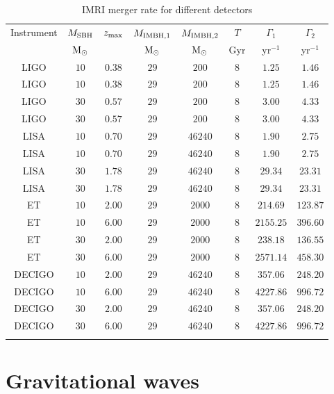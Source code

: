 \documentclass[twocolumn]{aastex62}
\newcommand{\Ms}{{\rm M}_\odot}
\newcommand{\ibh}{{\rm IMBH}}
\begin{document}
\begin{table}
\caption{IMRI merger rate for different detectors}
\begin{center}
\begin{tabular}{cccccccc}
\hline
Instrument & $M_{\rm SBH}$ & $z_{\rm max}$ & $M_{\ibh ,1}$ & $M_{\ibh ,2}$ & $T$ & $\Gamma_1$ & $\Gamma_2$ \\
   & $\Ms$ & &$\Ms$ & $\Ms$ & Gyr & yr$^{-1}$ & yr$^{-1}$ \\ 
\hline
LIGO & $10$ & $0.38$ & $29$ & $200$ & $8$ & $1.25$ &$1.46$ \\
LIGO & $10$ & $0.38$ & $29$ & $200$ & $8$ & $1.25$ &$1.46$ \\
LIGO & $30$ & $0.57$ & $29$ & $200$ & $8$ & $3.00$ &$4.33$ \\
LIGO & $30$ & $0.57$ & $29$ & $200$ & $8$ & $3.00$ &$4.33$ \\
LISA & $10$ & $0.70$ & $29$ & $46240$ & $8$ & $1.90$ &$2.75$ \\
LISA & $10$ & $0.70$ & $29$ & $46240$ & $8$ & $1.90$ &$2.75$ \\
LISA & $30$ & $1.78$ & $29$ & $46240$ & $8$ & $29.34$ &$23.31$ \\
LISA & $30$ & $1.78$ & $29$ & $46240$ & $8$ & $29.34$ &$23.31$ \\
ET & $10$ & $2.00$ & $29$ & $2000$ & $8$ & $214.69$ &$123.87$ \\
ET & $10$ & $6.00$ & $29$ & $2000$ & $8$ & $2155.25$ &$396.60$ \\
ET & $30$ & $2.00$ & $29$ & $2000$ & $8$ & $238.18$ &$136.55$ \\
ET & $30$ & $6.00$ & $29$ & $2000$ & $8$ & $2571.14$ &$458.30$ \\
DECIGO & $10$ & $2.00$ & $29$ & $46240$ & $8$ & $357.06$ &$248.20$ \\
DECIGO & $10$ & $6.00$ & $29$ & $46240$ & $8$ & $4227.86$ &$996.72$ \\
DECIGO & $30$ & $2.00$ & $29$ & $46240$ & $8$ & $357.06$ &$248.20$ \\
DECIGO & $30$ & $6.00$ & $29$ & $46240$ & $8$ & $4227.86$ &$996.72$ \\
\hline
\label{tab:5}
\end{tabular}
\end{center}
\end{table}




\section{Gravitational waves}
\end{document}
